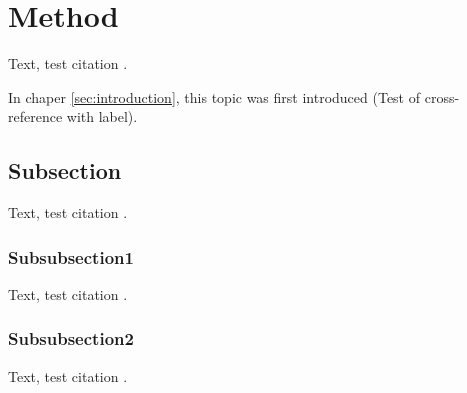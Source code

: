\section{Method}\label{sec:method}
Text, test citation \cite{web:website}.

In chaper \ref{sec:introduction}, this topic was first introduced (Test of
cross-reference with label).

\subsection{Subsection}
Text, test citation \cite{article:article}.
\subsubsection{Subsubsection1}
Text, test citation \cite{unpublished:unpublished}.
\subsubsection{Subsubsection2}
Text, test citation \cite{book:book}.
